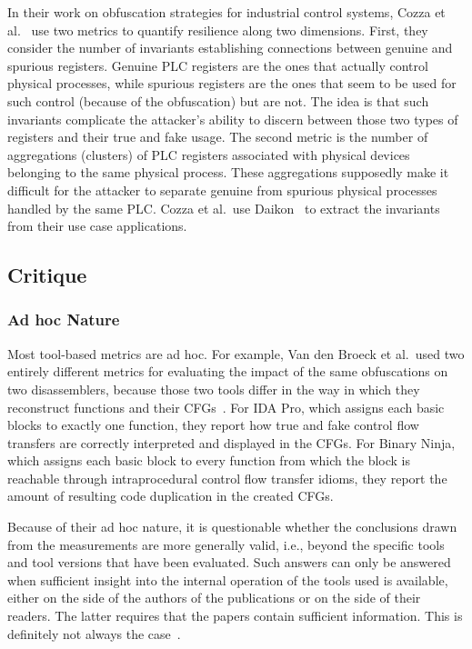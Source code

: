 In their work on obfuscation strategies for industrial control systems, Cozza et al.~\cite{mila24} use two metrics to quantify resilience along two dimensions. First, they consider the number of invariants establishing connections between genuine and spurious registers. Genuine PLC registers are the ones that actually control physical processes, while spurious registers are the ones that seem to be used for such control (because of the obfuscation) but are not. The idea is that such invariants complicate the attacker’s ability to discern between those two types of registers and their true and fake usage. The second metric is the number of aggregations (clusters) of PLC registers associated with physical devices belonging to the same physical process. These aggregations supposedly make it difficult for the attacker to separate genuine from spurious physical processes handled by the same PLC. Cozza et al.\ use Daikon~\cite{Daikon} to extract the invariants from their use case applications.

\subsection{Critique}

\subsubsection{Ad hoc Nature}
\label{sec:adhoc}
Most tool-based metrics are ad hoc. 
For example, Van den Broeck et al.\ used two entirely different metrics for evaluating the impact of the same obfuscations on two disassemblers, because those two tools differ in the way in which they reconstruct functions and their CFGs~\cite{jens21}. For IDA Pro, which assigns each basic blocks to exactly one function, they report how true and fake control flow transfers are correctly interpreted and displayed in the CFGs. For Binary Ninja, which assigns each basic block to every function from which the block is reachable through intraprocedural control flow transfer idioms, they report the amount of resulting code duplication in the created CFGs.

Because of their ad hoc nature, it is questionable whether the conclusions drawn from the measurements are more generally valid, i.e., beyond the specific tools and tool versions that have been evaluated. Such answers can only be answered when sufficient insight into the internal operation of the tools used is available, either on the side of the authors of the publications or on the side of their readers. The latter requires that the papers contain sufficient information. This is definitely not always the case~\cite{desutter2024evaluation}.

